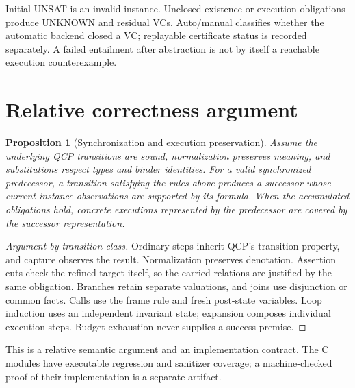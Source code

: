 \documentclass[10pt]{article}
\newtheorem{proposition}{Proposition}
\begin{document}
Initial UNSAT is an invalid instance. Unclosed existence or execution
obligations produce UNKNOWN and residual VCs. Auto/manual classifies whether
the automatic backend closed a VC; replayable certificate status is recorded
separately. A failed entailment after abstraction is not by itself a reachable
execution counterexample.

\section{Relative correctness argument}
\begin{proposition}[Synchronization and execution preservation]
Assume the underlying QCP transitions are sound, normalization preserves
meaning, and substitutions respect types and binder identities. For a valid
synchronized predecessor, a transition satisfying the rules above produces a
successor whose current instance observations are supported by its formula.
When the accumulated obligations hold, concrete executions represented by the
predecessor are covered by the successor representation.
\end{proposition}
\begin{proof}[Argument by transition class]
Ordinary steps inherit QCP's transition property, and capture observes the
result. Normalization preserves denotation. Assertion cuts check the refined
target itself, so the carried relations are justified by the same obligation.
Branches retain separate valuations, and joins use disjunction or common
facts. Calls use the frame rule and fresh post-state variables. Loop induction
uses an independent invariant state; expansion composes individual execution
steps. Budget exhaustion never supplies a success premise.
\end{proof}
This is a relative semantic argument and an implementation contract. The C
modules have executable regression and sanitizer coverage; a machine-checked
proof of their implementation is a separate artifact.
\end{document}
